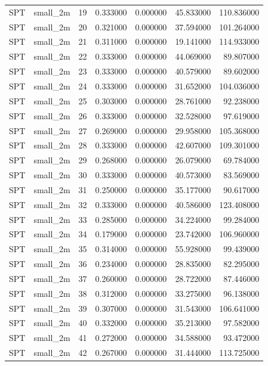 \begin{tabular}{llrrrrr}
SPT & small_2m & 19 & 0.333000 & 0.000000 & 45.833000 & 110.836000 \\
SPT & small_2m & 20 & 0.321000 & 0.000000 & 37.594000 & 101.264000 \\
SPT & small_2m & 21 & 0.311000 & 0.000000 & 19.141000 & 114.933000 \\
SPT & small_2m & 22 & 0.333000 & 0.000000 & 44.069000 & 89.807000 \\
SPT & small_2m & 23 & 0.333000 & 0.000000 & 40.579000 & 89.602000 \\
SPT & small_2m & 24 & 0.333000 & 0.000000 & 31.652000 & 104.036000 \\
SPT & small_2m & 25 & 0.303000 & 0.000000 & 28.761000 & 92.238000 \\
SPT & small_2m & 26 & 0.333000 & 0.000000 & 32.528000 & 97.619000 \\
SPT & small_2m & 27 & 0.269000 & 0.000000 & 29.958000 & 105.368000 \\
SPT & small_2m & 28 & 0.333000 & 0.000000 & 42.607000 & 109.301000 \\
SPT & small_2m & 29 & 0.268000 & 0.000000 & 26.079000 & 69.784000 \\
SPT & small_2m & 30 & 0.333000 & 0.000000 & 40.573000 & 83.569000 \\
SPT & small_2m & 31 & 0.250000 & 0.000000 & 35.177000 & 90.617000 \\
SPT & small_2m & 32 & 0.333000 & 0.000000 & 40.586000 & 123.408000 \\
SPT & small_2m & 33 & 0.285000 & 0.000000 & 34.224000 & 99.284000 \\
SPT & small_2m & 34 & 0.179000 & 0.000000 & 23.742000 & 106.960000 \\
SPT & small_2m & 35 & 0.314000 & 0.000000 & 55.928000 & 99.439000 \\
SPT & small_2m & 36 & 0.234000 & 0.000000 & 28.835000 & 82.295000 \\
SPT & small_2m & 37 & 0.260000 & 0.000000 & 28.722000 & 87.446000 \\
SPT & small_2m & 38 & 0.312000 & 0.000000 & 33.275000 & 96.138000 \\
SPT & small_2m & 39 & 0.307000 & 0.000000 & 31.543000 & 106.641000 \\
SPT & small_2m & 40 & 0.332000 & 0.000000 & 35.213000 & 97.582000 \\
SPT & small_2m & 41 & 0.272000 & 0.000000 & 34.588000 & 93.472000 \\
SPT & small_2m & 42 & 0.267000 & 0.000000 & 31.444000 & 113.725000 \\

\end{tabular}
